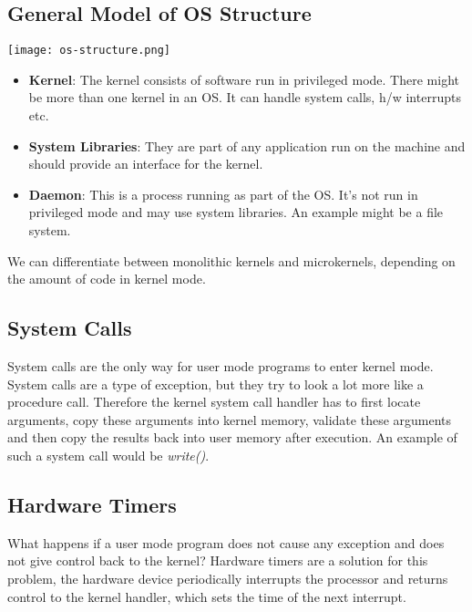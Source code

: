 \subsection{General Model of OS Structure}

\begin{center}
	\texttt{[image: os-structure.png]}
\end{center}

\begin{itemize}
	\item \textbf{Kernel}: The kernel consists of software run in privileged mode. There might be more than one kernel in an OS. It can handle system calls, h/w interrupts etc.
	\item \textbf{System Libraries}: They are part of any application run on the machine and should provide an interface for the kernel.
	\item \textbf{Daemon}: This is a process running as part of the OS. It’s not run in privileged mode and may use system libraries. An example might be a file system.
\end{itemize}

We can differentiate between monolithic kernels and microkernels, depending on the amount of code in kernel mode.


\subsection{System Calls}

System calls are the only way for user mode programs to enter kernel mode. System calls are a type of exception, but they try to look a lot more like a procedure call. Therefore the kernel system call handler has to first locate arguments, copy these arguments into kernel memory, validate these arguments and then copy the results back into user memory after execution. An example of such a system call would be \textit{write()}. 


\subsection{Hardware Timers}

What happens if a user mode program does not cause any exception and does not give control back to the kernel? Hardware timers are a solution for this problem, the hardware device periodically interrupts the processor and returns control to the kernel handler, which sets the time of the next interrupt.
